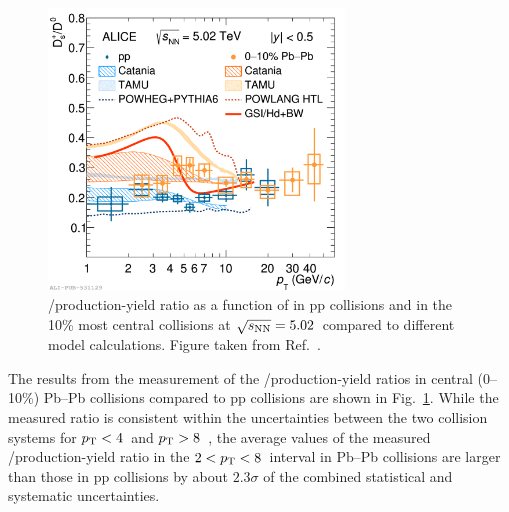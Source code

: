 \begin{figure}[htb]
    \centering
    \includegraphics[width=0.7\textwidth]{Figures/Chapter 9/DsOverD0_pp_PbPb_5dot02TeV.png}
    \caption{\ds/\dz production-yield ratio as a function of \pt in pp collisions and in the 10\% most central \pbpb collisions at $\sqrt{s_\mathrm{NN}}=5.02$~\tev compared to different model calculations. Figure taken from Ref.~\cite{ALICE:2022wpn}.}
    \label{fig:Double_ratio}
\end{figure}

The results from the measurement of the \ds/\dz production-yield ratios in central (0--10\%) Pb--Pb collisions compared to pp collisions are shown in Fig.~\ref{fig:Double_ratio}. While the measured ratio is consistent within the uncertainties between the two collision systems for $p_\mathrm{T}<4$~\gevc and $p_\mathrm{T}>8$~\gevc, the average values of the measured \ds/\dz production-yield ratio in the $2 < p_\mathrm{T} < 8$~\gevc interval in Pb--Pb collisions are larger than those in pp collisions by about $2.3\sigma$ of the combined statistical and systematic uncertainties.

